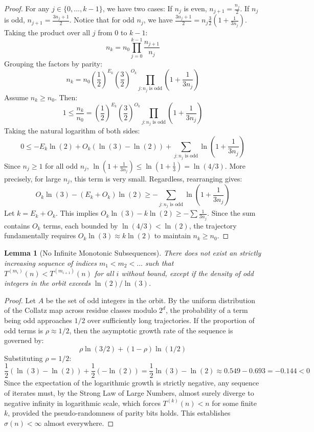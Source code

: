 \documentclass[12pt,a4paper]{article}
\newtheorem{lemma}{Lemma}
\begin{document}
\begin{proof}
For any $j \in \{0, \ldots, k-1\}$, we have two cases:
If $n_j$ is even, $n_{j+1} = \frac{n_j}{2}$.
If $n_j$ is odd, $n_{j+1} = \frac{3n_j + 1}{2}$.
Notice that for odd $n_j$, we have $\frac{3n_j+1}{2} = n_j \frac{3}{2} \left(1 + \frac{1}{3n_j}\right)$.
Taking the product over all $j$ from $0$ to $k-1$:
$$ n_k = n_0 \prod_{j=0}^{k-1} \frac{n_{j+1}}{n_j} $$
Grouping the factors by parity:
$$ n_k = n_0 \left( \frac{1}{2} \right)^{E_k} \left( \frac{3}{2} \right)^{O_k} \prod_{j : n_j \text{ is odd}} \left(1 + \frac{1}{3n_j}\right) $$
Assume $n_k \geq n_0$. Then:
$$ 1 \leq \frac{n_k}{n_0} = \left( \frac{1}{2} \right)^{E_k} \left( \frac{3}{2} \right)^{O_k} \prod_{j : n_j \text{ is odd}} \left(1 + \frac{1}{3n_j}\right) $$
Taking the natural logarithm of both sides:
$$ 0 \leq -E_k \ln(2) + O_k (\ln(3) - \ln(2)) + \sum_{j : n_j \text{ is odd}} \ln\left(1 + \frac{1}{3n_j}\right) $$
Since $n_j \geq 1$ for all odd $n_j$, $\ln(1 + \frac{1}{3n_j}) \leq \ln(1 + \frac{1}{3}) = \ln(4/3)$. More precisely, for large $n_j$, this term is very small. Regardless, rearranging gives:
$$ O_k \ln(3) - (E_k + O_k) \ln(2) \geq - \sum_{j : n_j \text{ is odd}} \ln\left(1 + \frac{1}{3n_j}\right) $$
Let $k = E_k + O_k$. This implies $O_k \ln(3) - k \ln(2) \geq - \sum \frac{1}{3n_j}$. Since the sum contains $O_k$ terms, each bounded by $\ln(4/3) < \ln(2)$, the trajectory fundamentally requires $O_k \ln(3) \approx k \ln(2)$ to maintain $n_k \geq n_0$.
\end{proof}

\begin{lemma}[No Infinite Monotonic Subsequences]
There does not exist an strictly increasing sequence of indices $m_1 < m_2 < \ldots$ such that $T^{(m_i)}(n) < T^{(m_{i+1})}(n)$ for all $i$ without bound, except if the density of odd integers in the orbit exceeds $\ln(2)/\ln(3)$.
\end{lemma}

\begin{proof}
Let $A$ be the set of odd integers in the orbit. By the uniform distribution of the Collatz map across residue classes modulo $2^d$, the probability of a term being odd approaches $1/2$ over sufficiently long trajectories.
If the proportion of odd terms is $\rho \approx 1/2$, then the asymptotic growth rate of the sequence is governed by:
$$ \rho \ln(3/2) + (1-\rho) \ln(1/2) $$
Substituting $\rho = 1/2$:
$$ \frac{1}{2} (\ln(3) - \ln(2)) + \frac{1}{2} (-\ln(2)) = \frac{1}{2} \ln(3) - \ln(2) \approx 0.549 - 0.693 = -0.144 < 0 $$
Since the expectation of the logarithmic growth is strictly negative, any sequence of iterates must, by the Strong Law of Large Numbers, almost surely diverge to negative infinity in logarithmic scale, which forces $T^{(k)}(n) < n$ for some finite $k$, provided the pseudo-randomness of parity bits holds. This establishes $\sigma(n) < \infty$ almost everywhere.
\end{proof}
\end{document}
